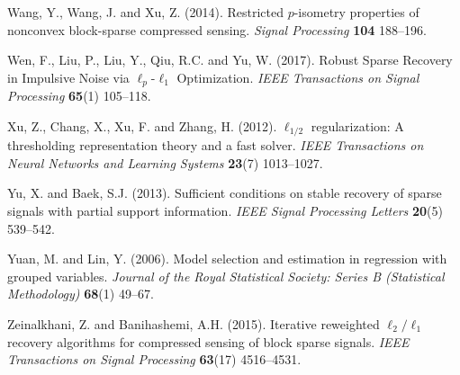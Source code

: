 \documentclass[11pt]{article}
\begin{document}
\begin{thebibliography}{}
	Wang, Y., Wang, J. and Xu, Z. (2014). Restricted $p$-isometry properties of nonconvex block-sparse compressed sensing. \textit{Signal Processing}
	\textbf{104} 188--196.
	
	Wen, F., Liu, P., Liu, Y., Qiu, R.C. and Yu, W. (2017). Robust Sparse Recovery in Impulsive Noise via $\ell_p $-$\ell_1$ Optimization. \textit{IEEE Transactions on Signal Processing}
	\textbf{65}(1) 105--118.
	
	Xu, Z., Chang, X., Xu, F. and Zhang, H. (2012). $\ell_{1/2}$ regularization: A thresholding representation theory and a fast solver. \textit{IEEE Transactions on Neural Networks and Learning Systems}
	\textbf{23}(7) 1013--1027.
	
	Yu, X. and Baek, S.J. (2013). Sufficient conditions on stable recovery of sparse signals with partial support information.
	\textit{IEEE Signal Processing Letters}
	\textbf{20}(5) 539--542.
	
	Yuan, M. and Lin, Y. (2006). Model selection and estimation in regression with grouped variables.  \textit{Journal of the Royal Statistical Society: Series B (Statistical Methodology)} \textbf{68}(1) 49--67.
	
	Zeinalkhani, Z. and Banihashemi, A.H. (2015). Iterative reweighted $\ell_2/\ell_1$ recovery algorithms for compressed sensing of block sparse signals.
	\textit{IEEE Transactions on Signal Processing}
	\textbf{63}(17) 4516--4531.
	
	
\end{thebibliography}
\end{document}
